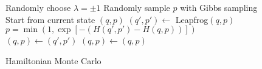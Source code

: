 \begin{figure}[H]
	\begin{algorithm}[H]
		\caption{Hamiltonian Monte Carlo}\label{algo:hmc}
		\begin{algorithmic}
      \State Randomly choose $\lambda = \pm 1$
      \State Randomly sample $p$ with Gibbs sampling
      \State Start from current state $(q, p)$ 
        \State $(q', p') \leftarrow$ Leapfrog$(q, p)$
      \EndFor
      \State $p = \min \left(1, \exp\left[-\left(H(q',p') - H(q, p)\right)\right]\right)$
        \State $(q, p) \leftarrow (q', p')$
      \Else
        \State $(q, p) \leftarrow (q, p)$
      \EndIf
		\end{algorithmic}
	\end{algorithm}
\end{figure}


